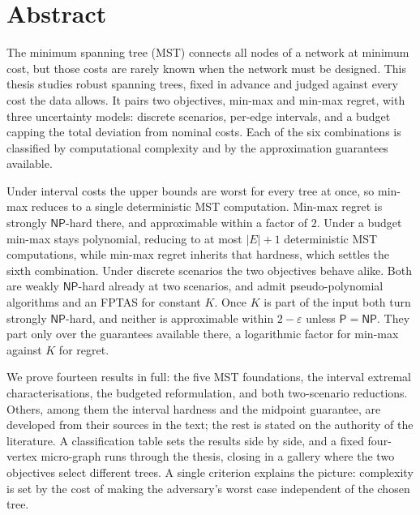 \chapter*{Abstract}

The minimum spanning tree (MST) connects all nodes of a network at minimum cost, but those costs are rarely known when the network must be designed. This thesis studies robust spanning trees, fixed in advance and judged against every cost the data allows. It pairs two objectives, min-max and min-max regret, with three uncertainty models: discrete scenarios, per-edge intervals, and a budget capping the total deviation from nominal costs. Each of the six combinations is classified by computational complexity and by the approximation guarantees available.

Under interval costs the upper bounds are worst for every tree at once, so min-max reduces to a single deterministic MST computation. Min-max regret is strongly $\mathsf{NP}$-hard there, and approximable within a factor of $2$. Under a budget min-max stays polynomial, reducing to at most $|E| + 1$ deterministic MST computations, while min-max regret inherits that hardness, which settles the sixth combination. Under discrete scenarios the two objectives behave alike. Both are weakly $\mathsf{NP}$-hard already at two scenarios, and admit pseudo-polynomial algorithms and an FPTAS for constant $K$. Once $K$ is part of the input both turn strongly $\mathsf{NP}$-hard, and neither is approximable within $2 - \varepsilon$ unless $\mathsf{P} = \mathsf{NP}$. They part only over the guarantees available there, a logarithmic factor for min-max against $K$ for regret.

We prove fourteen results in full: the five MST foundations, the interval extremal characterisations, the budgeted reformulation, and both two-scenario reductions. Others, among them the interval hardness and the midpoint guarantee, are developed from their sources in the text; the rest is stated on the authority of the literature. A classification table sets the results side by side, and a fixed four-vertex micro-graph runs through the thesis, closing in a gallery where the two objectives select different trees. A single criterion explains the picture: complexity is set by the cost of making the adversary's worst case independent of the chosen tree.

